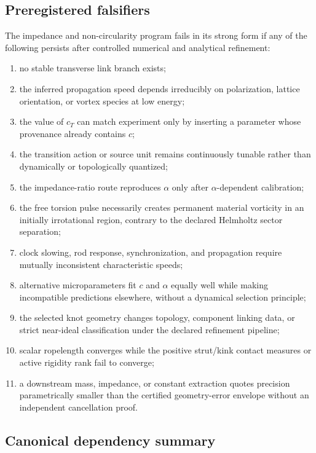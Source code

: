 \documentclass[11pt]{article}
\theoremstyle{definition}
\theoremstyle{plain}
\theoremstyle{remark}
\begin{document}
\subsection{Preregistered falsifiers}
\label{subsec:genesis_preregistered_falsifiers}

The impedance and non-circularity program fails in its strong form if any of the
following persists after controlled numerical and analytical refinement:

\begin{enumerate}
    \item no stable transverse link branch exists;
    \item the inferred propagation speed depends irreducibly on polarization,
    lattice orientation, or vortex species at low energy;
    \item the value of $c_T$ can match experiment only by inserting a parameter
    whose provenance already contains $c$;
    \item the transition action or source unit remains continuously tunable
    rather than dynamically or topologically quantized;
    \item the impedance-ratio route reproduces $\alpha$ only after
    $\alpha$-dependent calibration;
    \item the free torsion pulse necessarily creates permanent material
    vorticity in an initially irrotational region, contrary to the declared
    Helmholtz sector separation;
    \item clock slowing, rod response, synchronization, and propagation require
    mutually inconsistent characteristic speeds;
    \item alternative microparameters fit $c$ and $\alpha$ equally well while
    making incompatible predictions elsewhere, without a dynamical selection
    principle;
    \item the selected knot geometry changes topology, component linking data,
    or strict near-ideal classification under the declared refinement pipeline;
    \item scalar ropelength converges while the positive strut/kink contact
    measures or active rigidity rank fail to converge;
    \item a downstream mass, impedance, or constant extraction quotes precision
    parametrically smaller than the certified geometry-error envelope without an
    independent cancellation proof.
\end{enumerate}

\subsection{Canonical dependency summary}
\label{subsec:canonical_dependency_summary}
\end{document}
